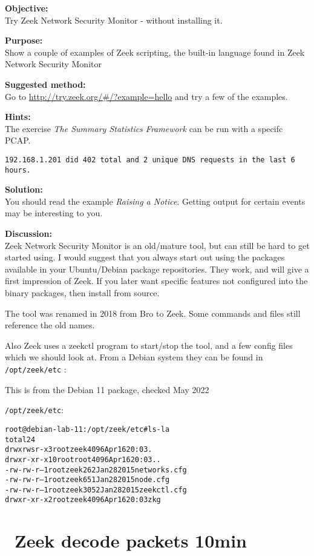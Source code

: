 \documentclass[a4paper,11pt,notitlepage]{report}
\begin{document}
{\bf Objective:} \\
Try Zeek Network Security Monitor - without installing it.


{\bf Purpose:}\\
Show a couple of examples of Zeek scripting, the built-in language found in Zeek Network Security Monitor


{\bf Suggested method:}\\
Go to \url{http://try.zeek.org/#/?example=hello} and try a few of the examples.

{\bf Hints:}\\
The exercise
\emph{The Summary Statistics Framework} can be run with a specifc PCAP.

\verb+192.168.1.201 did 402 total and 2 unique DNS requests in the last 6 hours.+

{\bf Solution:}\\
You should read the example \emph{Raising a Notice}. Getting output for certain events may be interesting to you.


{\bf Discussion:}\\
Zeek Network Security Monitor is an old/mature tool, but can still be hard to get started using. I would suggest that you always start out using the packages available in your Ubuntu/Debian package repositories.  They work, and will give a first impression of Zeek. If you later want specific features not configured into the binary packages, then install from source.

The tool was renamed in 2018 from Bro to Zeek. Some commands and files still reference the old names.

Also Zeek uses a zeekctl program to start/stop the tool, and a few config files which we should look at. From a Debian system they can be found in \verb+/opt/zeek/etc+ :

This is from the Debian 11 package, checked May 2022

\verb+/opt/zeek/etc+:
\begin{alltt}
root@debian-lab-11:/opt/zeek/etc# ls -la
total 24
drwxrwsr-x  3 root zeek 4096 Apr 16 20:03 .
drwxr-xr-x 10 root root 4096 Apr 16 20:03 ..
-rw-rw-r--  1 root zeek  262 Jan 28  2015 networks.cfg
-rw-rw-r--  1 root zeek  651 Jan 28  2015 node.cfg
-rw-rw-r--  1 root zeek 3052 Jan 28  2015 zeekctl.cfg
drwxr-xr-x  2 root zeek 4096 Apr 16 20:03 zkg
\end{alltt}

\chapter{\faInfoCircle\ Zeek decode packets 10min}
\label{ex:zeekdnsbasic}
\end{document}
